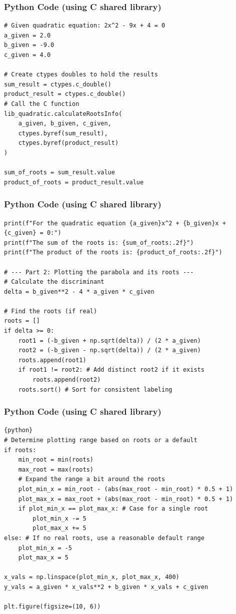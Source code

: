 \documentclass{beamer}
\begin{document}
\begin{frame}[fragile]
\frametitle{Python Code (using C shared library)}
\begin{lstlisting}
# Given quadratic equation: 2x^2 - 9x + 4 = 0
a_given = 2.0
b_given = -9.0
c_given = 4.0

# Create ctypes doubles to hold the results
sum_result = ctypes.c_double()
product_result = ctypes.c_double()
# Call the C function
lib_quadratic.calculateRootsInfo(
    a_given, b_given, c_given,
    ctypes.byref(sum_result),
    ctypes.byref(product_result)
)

sum_of_roots = sum_result.value
product_of_roots = product_result.value
\end{lstlisting}
\end{frame}

\begin{frame}[fragile]
\frametitle{Python Code (using C shared library)}
\begin{lstlisting}
print(f"For the quadratic equation {a_given}x^2 + {b_given}x + {c_given} = 0:")
print(f"The sum of the roots is: {sum_of_roots:.2f}")
print(f"The product of the roots is: {product_of_roots:.2f}")

# --- Part 2: Plotting the parabola and its roots ---
# Calculate the discriminant
delta = b_given**2 - 4 * a_given * c_given

# Find the roots (if real)
roots = []
if delta >= 0:
    root1 = (-b_given + np.sqrt(delta)) / (2 * a_given)
    root2 = (-b_given - np.sqrt(delta)) / (2 * a_given)
    roots.append(root1)
    if root1 != root2: # Add distinct root2 if it exists
        roots.append(root2)
    roots.sort() # Sort for consistent labeling
\end{lstlisting}
\end{frame}

\begin{frame}[fragile]
\frametitle{Python Code (using C shared library)}
\begin{lstlisting}{python}
# Determine plotting range based on roots or a default
if roots:
    min_root = min(roots)
    max_root = max(roots)
    # Expand the range a bit around the roots
    plot_min_x = min_root - (abs(max_root - min_root) * 0.5 + 1)
    plot_max_x = max_root + (abs(max_root - min_root) * 0.5 + 1)
    if plot_min_x == plot_max_x: # Case for a single root
        plot_min_x -= 5
        plot_max_x += 5
else: # If no real roots, use a reasonable default range
    plot_min_x = -5
    plot_max_x = 5

x_vals = np.linspace(plot_min_x, plot_max_x, 400)
y_vals = a_given * x_vals**2 + b_given * x_vals + c_given

plt.figure(figsize=(10, 6))
\end{lstlisting}
\end{frame}
\end{document}
